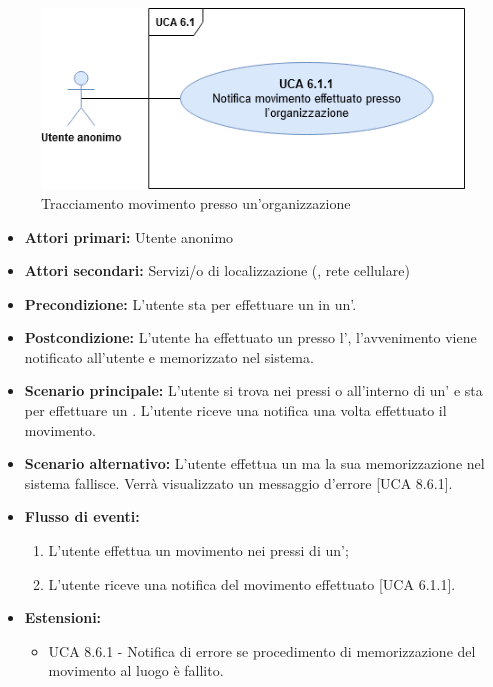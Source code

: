 \begin{figure}[h]
	\centering
	\includegraphics[scale=0.4, center]{Sezioni/UseCase/Immagini/UCA6.1.png}
	\caption{Tracciamento movimento presso un'organizzazione}
\end{figure}


\begin{itemize}
	\item \textbf{Attori primari:} Utente anonimo
	\item \textbf{Attori secondari:} Servizi/o di localizzazione (, rete cellulare)
	\item \textbf{Precondizione:} L'utente sta per effettuare un  in un'.
	\item \textbf{Postcondizione:} L'utente ha effettuato un  presso l', l'avvenimento viene notificato all'utente e memorizzato nel sistema. 
	\item \textbf{Scenario principale:} L'utente si trova nei pressi o all'interno di un' e sta per effettuare un . L'utente riceve una notifica una volta effettuato il movimento.
	\item \textbf{Scenario alternativo:} L'utente effettua un  ma la sua memorizzazione nel sistema fallisce. Verrà visualizzato un messaggio d'errore [UCA 8.6.1].
	\item \textbf{Flusso di eventi:}
	\begin{enumerate}
		\item L'utente effettua un movimento nei pressi di un';
		\item L'utente riceve una notifica del movimento effettuato [UCA 6.1.1].
	\end{enumerate}
	\item \textbf{Estensioni:}
	\begin{itemize}
		\item UCA 8.6.1 - Notifica di errore se procedimento di memorizzazione del movimento al luogo è fallito.
	\end{itemize}
\end{itemize}

